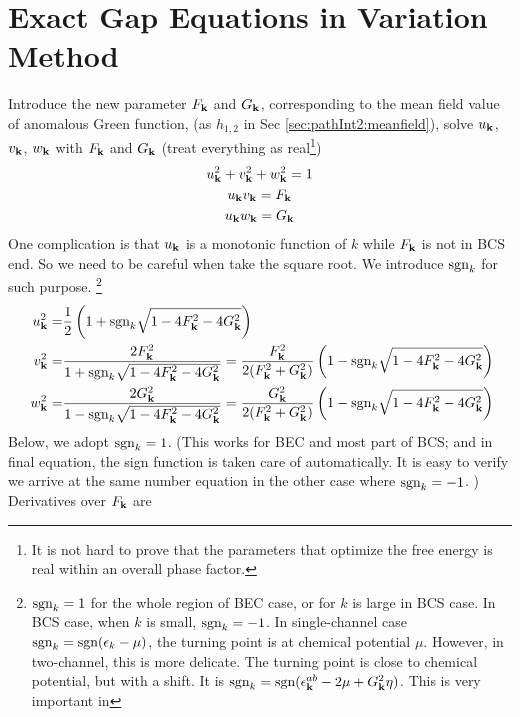  \section{Exact Gap Equations in Variation Method}
Introduce the new parameter $F_{\mathbf{k}}$ and $G_{\mathbf{k}}$, corresponding to the mean field value of anomalous Green function,  (as $h_{1,2}$  in Sec \ref{sec:pathInt2:meanfield}), solve $u_{\mathbf{k}}$, $v_{\mathbf{k}}$, $w_{\mathbf{k}}$ with $F_{\mathbf{k}}$ and $G_{\mathbf{k}}$ (treat everything as real\footnote{It is not hard to prove that the parameters that optimize the free energy is real within an overall phase factor. })
\begin{gather}
u_{\mathbf{k}}^2+v^{2}_{\mathbf{k}}+w^{2}_{\mathbf{k}}=1\\
u_{\mathbf{k}}v_{\mathbf{k}}=F_{\mathbf{k}}\\
u_{\mathbf{k}}w_{\mathbf{k}}=G_{\mathbf{k}}
\end{gather}
One complication is that $u_{\mathbf{k}}$ is a monotonic function of $k$ while $F_{\mathbf{k}}$ is not in BCS end.  So we need to be careful when take the square root.  We introduce $\text{sgn}_k$ for such purpose.  \footnote{\label{foot:20100909:sgn} $\text{sgn}_k=1$  for the whole region of BEC case, or for $k$ is large in BCS case. In BCS case, when $k$ is small, $\text{sgn}_{k}=-1$.  In single-channel case $\text{sgn}_{k}=\text{sgn}(\epsilon_{k}-\mu)$, the turning point is at chemical potential $\mu$.  However, in two-channel, this is more delicate.  The turning point is close to chemical potential, but with a shift. It is $\text{sgn}_k=\text{sgn}(\epsilon^{ab}_{\mathbf{k}}-2\mu+  G_{\mathbf{k}}^2\eta)$.  This is very important in }
\begin{equation}
\begin{split}
u_{\mathbf{k}}^2=&\frac{1}{2} \left(1+\text{sgn}_{k}\sqrt{1-4 F_{\mathbf{k}}^2-4 G_{\mathbf{k}}^2}\right)\\
v^{2}_{\mathbf{k}}=&\frac{2 F_{\mathbf{k}}^2}{1+\text{sgn}_{k}\sqrt{1-4 F_{\mathbf{k}}^2-4 G_{\mathbf{k}}^2}}
=\frac{ F_{\mathbf{k}}^2}{2( F_{\mathbf{k}}^2+ G_{\mathbf{k}}^2)} \left(1-\text{sgn}_{k}\sqrt{1-4 F_{\mathbf{k}}^2-4 G_{\mathbf{k}}^2}\right)\\\
w^{2}_{\mathbf{k}}=&\frac{2 G_{\mathbf{k}}^2}{1-\text{sgn}_{k}\sqrt{1-4 F_{\mathbf{k}}^2-4 G_{\mathbf{k}}^2}}
=\frac{G_{\mathbf{k}}^2}{2( F_{\mathbf{k}}^2+ G_{\mathbf{k}}^2)} \left(1-\text{sgn}_{k}\sqrt{1-4 F_{\mathbf{k}}^2-4 G_{\mathbf{k}}^2}\right)
\end{split}
\end{equation}
Below, we adopt $\text{sgn}_k=1$. (This works for BEC and most part of BCS; and in final equation, the sign function is taken care of automatically.  It is easy to verify we arrive at the same number equation in the other case where $\text{sgn}_{k}=-1$. ) Derivatives over $F_{\mathbf{k}}$ are
